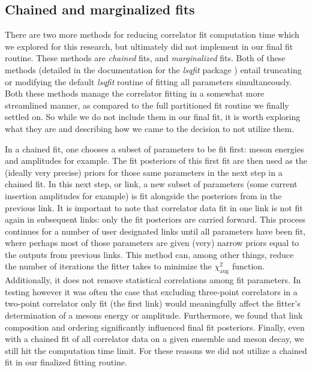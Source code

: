 \subsection{Chained and marginalized fits}\label{sec:chained_and_marginalized}
There are two more methods for reducing correlator fit computation time which we explored for this research, but ultimately did not implement in our final fit routine.  These methods are \textit{chained} fits, and \textit{marginalized} fits.  Both of these methods (detailed in the documentation for the \textit{lsqfit} package \cite{peter_lepage_2024_12690493}) entail truncating or modifying the default \textit{lsqfit} routine of fitting all parameters simultaneously. Both these methods manage the correlator fitting in a somewhat more streamlined manner, as compared to the full partitioned fit routine we finally settled on.  So while we do not include them in our final fit, it is worth exploring what they are and describing how we came to the decision to not utilize them.

In a chained fit, one chooses a subset of parameters to be fit first: meson energies and amplitudes for example.  The fit posteriors of this first fit are then used as the (ideally very precise) priors for those same parameters in the next step in a chained fit.  In this next step, or link, a new subset of parameters (some current insertion amplitudes for example) is fit alongside the posteriors from in the previous link.  It is important to note that correlator data fit in one link is not fit again in subsequent links: only the fit posteriors are carried forward.  This process continues for a number of user designated links until all parameters have been fit, where perhaps most of those parameters are given (very) narrow priors equal to the outputs from previous links.  This method can, among other things, reduce the number of iterations the fitter takes to minimize the $\chi^2_\mathrm{aug}$ function.  Additionally, it does not remove statistical correlations among fit parameters.  In testing however it was often the case that excluding three-point correlators in a two-point correlator only fit (the first link) would meaningfully affect the fitter's determination of a mesons energy or amplitude.  Furthermore, we found that link composition and ordering significantly influenced final fit posteriors.  Finally, even with a chained fit of all correlator data on a given ensemble and  meson decay, we still hit the computation time limit.  For these reasons we did not utilize a chained fit in our finalized fitting routine.

